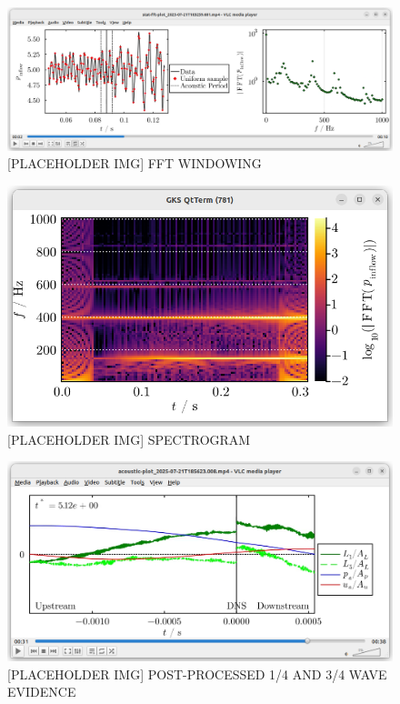 






\begin{figure}[t]
\centering
\includegraphics[scale=0.35]{assets/graphs/fft-windowing.png}
\caption{[PLACEHOLDER IMG] FFT WINDOWING}
\label{fig:windowing}
\end{figure}

\begin{figure}[t]
\centering
\includegraphics[scale=0.35]{assets/graphs/spectrogram.png}
\caption{[PLACEHOLDER IMG] SPECTROGRAM}
\label{fig:spectrogram}
\end{figure}

\begin{figure}[t]
\centering
\includegraphics[scale=0.35]{assets/graphs/pp-tones.png}
\caption{[PLACEHOLDER IMG] POST-PROCESSED 1/4 AND 3/4 WAVE EVIDENCE}
\label{fig:pp-tones}
\end{figure}


